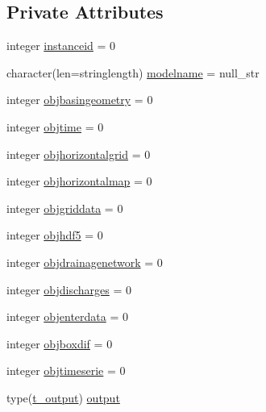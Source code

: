 \subsection*{Private Attributes}
\begin{DoxyCompactItemize}
\item 
integer \mbox{\hyperlink{structmodulerunoff_1_1t__runoff_a0cfaa27ac7daca4e7706975f07b182b0}{instanceid}} = 0
\item 
character(len=stringlength) \mbox{\hyperlink{structmodulerunoff_1_1t__runoff_a60648ad830fe75fe29bbcea82c272e61}{modelname}} = null\+\_\+str
\item 
integer \mbox{\hyperlink{structmodulerunoff_1_1t__runoff_ac4cc65ca3e2c8aaef833ef1b26ea68d1}{objbasingeometry}} = 0
\item 
integer \mbox{\hyperlink{structmodulerunoff_1_1t__runoff_a76b7714e0a902461535c9848b2358d39}{objtime}} = 0
\item 
integer \mbox{\hyperlink{structmodulerunoff_1_1t__runoff_a0233fb5675d70a567e79aeb1a7a0820b}{objhorizontalgrid}} = 0
\item 
integer \mbox{\hyperlink{structmodulerunoff_1_1t__runoff_a102db83b8c5ce98632dd344eea2cb8de}{objhorizontalmap}} = 0
\item 
integer \mbox{\hyperlink{structmodulerunoff_1_1t__runoff_a2d2b1c506a2ca20d71317576c84c55fa}{objgriddata}} = 0
\item 
integer \mbox{\hyperlink{structmodulerunoff_1_1t__runoff_a717be74f6d97f66a2c80292d8a4c980a}{objhdf5}} = 0
\item 
integer \mbox{\hyperlink{structmodulerunoff_1_1t__runoff_a08cfbfc15e2d1674a156a287c0bd1f26}{objdrainagenetwork}} = 0
\item 
integer \mbox{\hyperlink{structmodulerunoff_1_1t__runoff_a7bf5bdb04d714ff94d3b513c494c4cd3}{objdischarges}} = 0
\item 
integer \mbox{\hyperlink{structmodulerunoff_1_1t__runoff_a294993d760d17e77533e8d12aba5a0a6}{objenterdata}} = 0
\item 
integer \mbox{\hyperlink{structmodulerunoff_1_1t__runoff_a97b9d5ccaa4883e4febacf311cfb06f2}{objboxdif}} = 0
\item 
integer \mbox{\hyperlink{structmodulerunoff_1_1t__runoff_aa50264598e175bf086af52e086166aaf}{objtimeserie}} = 0
\item 
type(\mbox{\hyperlink{structmodulerunoff_1_1t__output}{t\+\_\+output}}) \mbox{\hyperlink{structmodulerunoff_1_1t__runoff_ab8fc8b54efe362a7585b71d33697c19b}{output}}
\item 

\end{DoxyCompactItemize}
